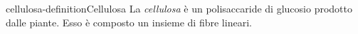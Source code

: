 \documentclass[preview]{standalone}
\begin{document}
\begin{snippetdefinition}{cellulosa-definition}{Cellulosa}
    La \textit{cellulosa} è un polisaccaride di glucosio prodotto dalle piante.
    Esso è composto un insieme di fibre lineari.
\end{snippetdefinition}


\end{document}
